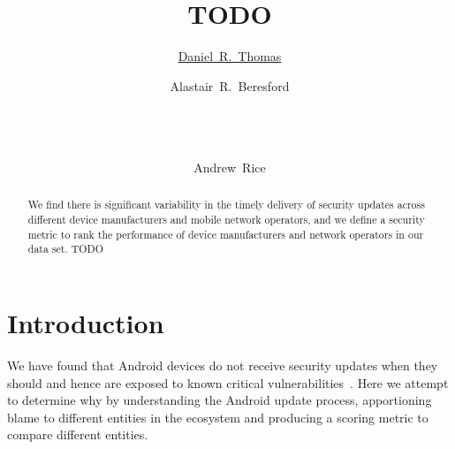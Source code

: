 \documentclass{sig-alternate}
\begin{document}
%

\title{TODO}

\author{
\href{http://orcid.org/0000-0001-8936-0683}{Daniel~R.~Thomas}
\and
Alastair~R.~Beresford\\
       \\
       \\
       \\
\and
Andrew~Rice
}


\maketitle

\begin{abstract}
We find there is significant variability in the timely delivery of security updates across different device manufacturers and mobile network operators, and we define a security metric to rank the performance of device manufacturers and network operators in our data set.
TODO
\end{abstract}

\category{}{}{}

\terms{}

\keywords{}

\section{Introduction}

We have found that Android devices do not receive security updates when they should and hence are exposed to known critical vulnerabilities~\cite{androidvulnerabilities.org}.
Here we attempt to determine why by understanding the Android update process, apportioning blame to different entities in the ecosystem and producing a scoring metric to compare different entities.
\end{document}
